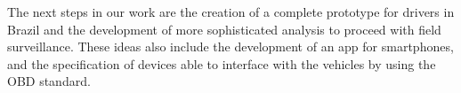 \documentclass[sigplan]{acmart}
\begin{document}
The next steps in our work are the creation of a complete prototype for drivers in Brazil and the development of more sophisticated analysis to proceed with field surveillance.
These ideas also include the development of an app for smartphones, and the specification of devices able to interface with the vehicles by using the OBD standard.


 
\end{document}
